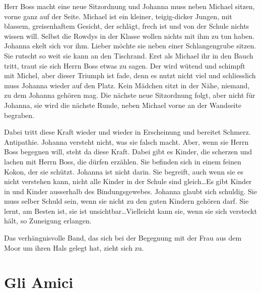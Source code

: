 \documentclass[10pt,titlepage,a5paper]{book}
\begin{document}
Herr Boss macht eine neue Sitzordnung und Johanna muss neben Michael sitzen, vorne ganz auf der Seite. Michael ist ein kleiner, teigig-dicker Jungen, mit blassem, greisenhaftem Gesicht, der schlägt, frech ist und von der Schule nichts wissen will. Selbst die Rowdys in der Klasse wollen nichts mit ihm zu tun haben. Johanna ekelt sich vor ihm. Lieber möchte sie neben einer Schlangengrube sitzen. Sie rutscht so weit sie kann an den Tischrand. Erst als Michael ihr in den Bauch tritt, traut sie sich Herrn Boss etwas zu sagen. Der wird wütend und schimpft mit Michel, aber dieser Triumph ist fade, denn es nutzt nicht viel und schliesslich muss Johanna wieder auf den Platz. Kein Mädchen sitzt in der Nähe, niemand, zu dem Johanna gehören mag. Die nächste neue Sitzordnung folgt, aber nicht für Johanna, sie wird die nächste Runde, neben Michael vorne an der Wandseite begraben.

Dabei tritt diese Kraft wieder und wieder in Erscheinung und bereitet Schmerz. Antipathie. Johanna versteht nicht, was sie falsch macht. Aber, wenn sie Herrn Boss begegnen will, steht da diese Kraft. Dabei gibt es Kinder, die scherzen und lachen mit Herrn Boss, die dürfen erzählen. Sie befinden sich in einem feinen Kokon, der sie schützt. Johanna ist nicht darin. Sie begreift, auch wenn sie es nicht verstehen kann, nicht alle Kinder in der Schule sind gleich\dots Es gibt Kinder in und Kinder ausserhalb des Bindungsgewebes. Johanna glaubt sich schuldig. Sie muss selber Schuld sein, wenn sie nicht zu den guten Kindern gehören darf. Sie lernt, am Besten ist, sie ist unsichtbar\dots Vielleicht kann sie, wenn sie sich versteckt hält, so Zuneigung erlangen.

Das verhängnisvolle Band, das sich bei der Begegnung mit der Frau aus dem Moor um ihren Hals gelegt hat, zieht sich zu.



\section*{ Gli Amici}
\end{document}
